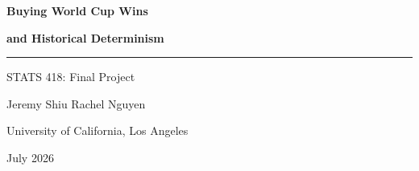 \documentclass{article}
\begin{document}
\begin{titlepage}
\thispagestyle{empty}
\vspace*{2.5cm}

{\fontsize{30}{34}\selectfont\bfseries
Buying World Cup Wins
\par}

\vspace{0.25cm}

{\fontsize{20}{24}\selectfont\bfseries
and Historical Determinism
\par}

\vspace{0.6cm}

\rule{0.65\textwidth}{0.7pt}

\vspace{1cm}

{\Large
STATS 418: Final Project
}

\vfill

{\large
Jeremy Shiu \hspace{1cm} Rachel Nguyen
}

\vspace{0.4cm}

{\large
University of California, Los Angeles
}

\vspace{0.3cm}

{\large
July 2026
}

\end{titlepage}

\pagestyle{fancy}
\fancyhf{}                  %
\fancyfoot[R]{\thepage}             %
\renewcommand{\headrulewidth}{0pt} %
\renewcommand{\footrulewidth}{0pt} %

\clearpage
\tableofcontents
\clearpage
\end{document}

